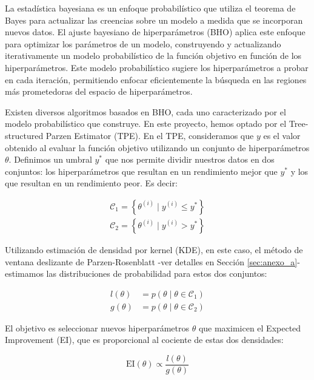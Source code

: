 La estadística bayesiana es un enfoque probabilístico que utiliza el teorema de Bayes para actualizar las creencias sobre un modelo a medida que se incorporan nuevos datos. El ajuste bayesiano de hiperparámetros (BHO) aplica este enfoque para optimizar los parámetros de un modelo, construyendo y actualizando iterativamente un modelo probabilístico de la función objetivo en función de los hiperparámetros. Este modelo probabilístico sugiere los hiperparámetros a probar en cada iteración, permitiendo enfocar eficientemente la búsqueda en las regiones más prometedoras del espacio de hiperparámetros.

Existen diversos algoritmos basados en BHO, cada uno caracterizado por el modelo probabilístico que construye. En este proyecto, hemos optado por el Tree-structured Parzen Estimator (TPE). En el TPE, consideramos que \( y \) es el valor obtenido al evaluar la función objetivo utilizando un conjunto de hiperparámetros \( \theta \). Definimos un umbral \( y^* \) que nos permite dividir nuestros datos en dos conjuntos: los hiperparámetros que resultan en un rendimiento mejor que \( y^* \) y los que resultan en un rendimiento peor. Es decir:

\begin{equation}
	\begin{aligned}
		\mathcal{C}_1 = \left\{ \theta^{(i)} \mid y^{(i)} \leq y^* \right\} \\
		\mathcal{C}_2 = \left\{ \theta^{(i)} \mid y^{(i)} > y^* \right\}
	\end{aligned}
\end{equation}

Utilizando estimación de densidad por kernel (KDE), en este caso, el método de ventana deslizante de Parzen-Rosenblatt -ver detalles en Sección \ref{sec:anexo_a}- estimamos las distribuciones de probabilidad para estos dos conjuntos:

\begin{equation}
	\begin{aligned}
		l(\theta) &= p(\theta \mid \theta \in \mathcal{C}_1) \\
		g(\theta) &= p(\theta \mid \theta \in \mathcal{C}_2)
	\end{aligned}
\end{equation}

El objetivo es seleccionar nuevos hiperparámetros \( \theta \) que maximicen el Expected Improvement (EI), que es proporcional al cociente de estas dos densidades:

\begin{equation}
	\mathrm{EI}(\theta) \propto \frac{l(\theta)}{g(\theta)}
\end{equation}

